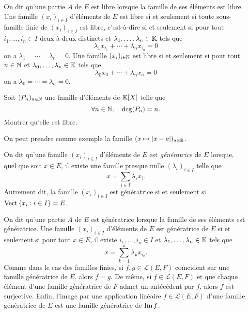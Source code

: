 \documentclass{magnolia}
\begin{document}
\begin{remarques}
\remarque On dit qu'une partie $A$ de $E$ est libre lorsque la famille de ses éléments est
  libre.
\remarque Une famille $(x_i)_{i\in I}$ d'éléments de $E$ est libre si et seulement si
  toute sous-famille finie de $(x_i)_{i\in I}$ est libre, c'est-à-dire si et seulement si
  pour tout $i_1,\ldots,i_n\in I$ deux à deux distincts et $\lambda_1,\ldots,\lambda_n\in\mathbb{K}$
  tels que
  \[\lambda_1 x_{i_1}+\cdots+\lambda_n x_{i_n}=0\]
  on a $\lambda_1=\cdots=\lambda_n=0$.
\remarque Une famille $(x_i)_{i\in\mathbb{N}}$ est libre si et seulement si pour tout $n\in\mathbb{N}$
  et $\lambda_0,\ldots,\lambda_n\in\mathbb{K}$ tels que
  \[\lambda_0 x_0+\cdots+\lambda_n x_n=0\]
  on a $\lambda_0=\cdots=\lambda_n=0$.
\end{remarques}

\begin{exoUnique}
\exo Soit $(P_n)_{n\in\mathbb{N}}$ une famille d'éléments de $\polyK$ telle que
\[\forall n\in\mathbb{N},\quad \deg(P_n)=n.\]
Montrer qu'elle est libre.
\end{exoUnique}

\begin{sol}
On peut prendre comme exemple la famille $(x\mapsto |x-a|)_{a\in \mathbb{R}}$.
\end{sol}

\begin{definition}[utile=-3]
On dit qu'une famille $(x_i)_{i\in I}$ d'éléments de $E$ est \emph{génératrice} de $E$ lorsque, quel que soit
$x\in E$, il existe une famille presque nulle $(\lambda_i)_{i\in I}$ telle que
\[x=\sum_{i\in I} \lambda_i x_i.\]
Autrement dit, la famille $(x_i)_{i\in I}$ est génératrice si et seulement si $\operatorname{Vect}\left\{x_i : i\in I\right\}=E$.
\end{definition}

\begin{remarques}
\remarque On dit qu'une partie $A$ de $E$ est génératrice lorsque la famille de ses éléments est génératrice.
\remarque Une famille $(x_i)_{i\in I}$ d'éléments de $E$ est génératrice de $E$ si et
seulement si pour tout $x\in E$, il existe $i_1,\ldots,i_n\in I$ et $\lambda_1,\ldots,\lambda_n\in\mathbb{K}$ tels que
\[x=\sum_{k=1}^n \lambda_k x_{i_k}.\]
\remarque Comme dans le cas des familles finies, si $f,g\in\mathcal{L}(E,F)$ coïncident sur une famille génératrice de
$E$, alors $f=g$. De même, si $f\in\mathcal{L}(E,F)$ et que chaque élément d'une famille génératrice de $F$ admet un antécédent
par $f$, alors $f$ est surjective.
\remarque Enfin, l'image par une application linéaire $f\in\mathcal{L}(E, F)$ d'une famille génératrice de $E$ est une famille
génératrice de $\operatorname{Im} f$.
\end{remarques}
\end{document}
